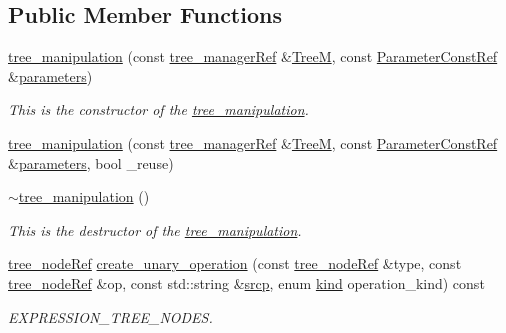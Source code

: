 \subsection*{Public Member Functions}
\begin{DoxyCompactItemize}
\item 
\hyperlink{classtree__manipulation_ad3de991374ef8c15e18d60fe8ad346e4}{tree\+\_\+manipulation} (const \hyperlink{tree__manager_8hpp_a96ff150c071ce11a9a7a1e40590f205e}{tree\+\_\+manager\+Ref} \&\hyperlink{classtree__manipulation_aee245cc376915c8ec6cff7d8636aa411}{TreeM}, const \hyperlink{Parameter_8hpp_a37841774a6fcb479b597fdf8955eb4ea}{Parameter\+Const\+Ref} \&\hyperlink{classtree__manipulation_a33e7af50148a33e3f8ef9621c094fa1a}{parameters})
\begin{DoxyCompactList}\small\item\em This is the constructor of the \hyperlink{classtree__manipulation}{tree\+\_\+manipulation}. \end{DoxyCompactList}\item 
\hyperlink{classtree__manipulation_a3bd71cc78853ef105053e9d902ed0111}{tree\+\_\+manipulation} (const \hyperlink{tree__manager_8hpp_a96ff150c071ce11a9a7a1e40590f205e}{tree\+\_\+manager\+Ref} \&\hyperlink{classtree__manipulation_aee245cc376915c8ec6cff7d8636aa411}{TreeM}, const \hyperlink{Parameter_8hpp_a37841774a6fcb479b597fdf8955eb4ea}{Parameter\+Const\+Ref} \&\hyperlink{classtree__manipulation_a33e7af50148a33e3f8ef9621c094fa1a}{parameters}, bool \+\_\+reuse)
\item 
\hyperlink{classtree__manipulation_a77557dd87ecad9255e0fa23178aead99}{$\sim$tree\+\_\+manipulation} ()
\begin{DoxyCompactList}\small\item\em This is the destructor of the \hyperlink{classtree__manipulation}{tree\+\_\+manipulation}. \end{DoxyCompactList}\item 
\hyperlink{tree__node_8hpp_a6ee377554d1c4871ad66a337eaa67fd5}{tree\+\_\+node\+Ref} \hyperlink{classtree__manipulation_ad87bbd38f417db13f3699aeccf6011a4}{create\+\_\+unary\+\_\+operation} (const \hyperlink{tree__node_8hpp_a6ee377554d1c4871ad66a337eaa67fd5}{tree\+\_\+node\+Ref} \&type, const \hyperlink{tree__node_8hpp_a6ee377554d1c4871ad66a337eaa67fd5}{tree\+\_\+node\+Ref} \&op, const std\+::string \&\hyperlink{structsrcp}{srcp}, enum \hyperlink{tree__common_8hpp_a9efbd7c7191fb190b76c2fd05d6e7b45}{kind} operation\+\_\+kind) const
\begin{DoxyCompactList}\small\item\em E\+X\+P\+R\+E\+S\+S\+I\+O\+N\+\_\+\+T\+R\+E\+E\+\_\+\+N\+O\+D\+ES. \end{DoxyCompactList}\item 

\end{DoxyCompactItemize}
